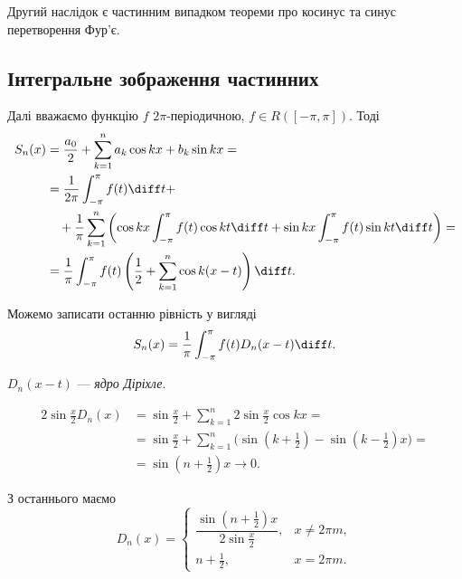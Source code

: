 \begin{remark}
    Другий наслідок є частинним випадком теореми про косинус та синус перетворення Фур'є.
\end{remark}

\subsection{Інтегральне зображення частинних}%

Далі вважаємо функцію $f$ $2\pi$-періодичною, $f \in R([-\pi,\pi])$. Тоді
\begin{equation}
    \begin{aligned}
        S_n(x) 
        &= \frac{a_0}{2} + \sum_{k = 1}^n a_k \cos kx + b_k \sin kx = \\
        &= \frac{1}{2\pi} \int_{-\pi}^\pi f(t) \diff t + \\
        &\quad + \frac{1}{\pi} \sum_{k = 1}^n \left( \cos kx \int_{-\pi}^\pi f(t) \cos kt \diff t + \sin k x \int_{-\pi}^\pi f(t) \sin kt \diff t \right) = \\
        &= \frac{1}{\pi} \int_{-\pi}^\pi f(t) \left( \frac{1}{2} + \sum_{k = 1}^n \cos k (x - t) \right) \diff t.
    \end{aligned}
\end{equation}

Можемо записати останню рівність у вигляді
\begin{equation}
    S_n(x) = \frac{1}{\pi} \int_{-\pi}^\pi f(t) D_n(x - t) \diff t.
\end{equation}

\begin{definition}
    $D_n(x - t)$ --- \textit{ядро Діріхле}.
\end{definition}

\begin{equation}
    \begin{aligned}
        2 \sin \tfrac{x}{2} D_n(x) 
        &= \sin \tfrac{x}{2} + \sum_{k = 1}^n 2 \sin \tfrac{x}{2} \cos k x = \\
        &= \sin \tfrac{x}{2} + \sum_{k = 1}^n \Big( \sin (k + \tfrac{1}{2}) - \sin(k - \tfrac{1}{2}) x \Big) = \\
        &= \sin (n + \tfrac{1}{2}) x \to 0.
    \end{aligned}
\end{equation}

З останнього маємо
\begin{equation}
    D_n(x) = \begin{cases}
        \dfrac{\sin(n + \frac{1}{2})x}{2 \sin \tfrac{x}{2}}, & x \ne 2 \pi m, \\
        n + \frac{1}{2}, & x = 2 \pi m.
    \end{cases}
\end{equation}

